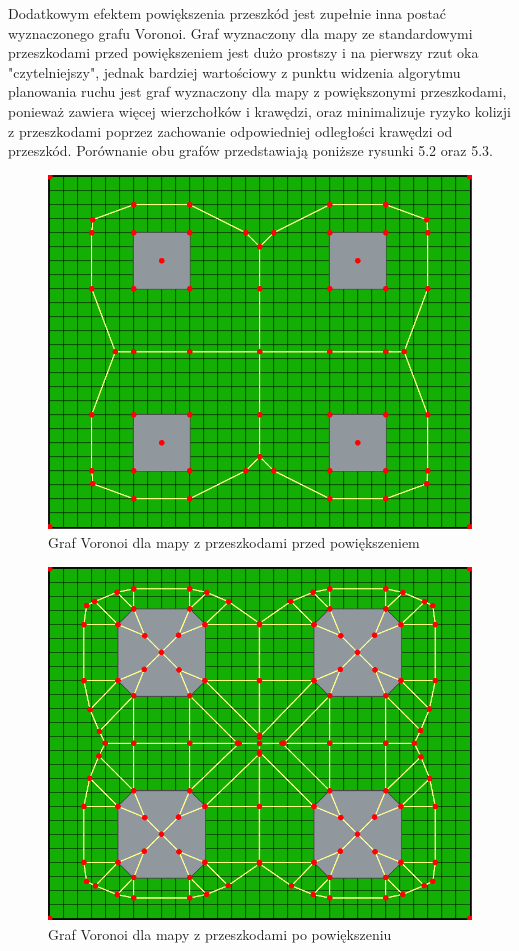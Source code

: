 \documentclass[a4paper,11pt,twoside]{report}
\theoremstyle{definition}
\begin{document}
Dodatkowym efektem powiększenia przeszkód jest zupełnie inna postać wyznaczonego grafu Voronoi. Graf wyznaczony dla mapy ze standardowymi przeszkodami przed powiększeniem jest dużo prostszy i na pierwszy rzut oka "czytelniejszy", jednak bardziej wartościowy z punktu widzenia algorytmu planowania ruchu jest graf wyznaczony dla mapy z powiększonymi przeszkodami, ponieważ zawiera więcej wierzchołków i krawędzi, oraz minimalizuje ryzyko kolizji z przeszkodami poprzez zachowanie odpowiedniej odległości krawędzi od przeszkód. Porównanie obu grafów przedstawiają poniższe rysunki 5.2 oraz 5.3.

\begin{figure}[h!]
\centering
\includegraphics[scale=0.4]{voronoiGraphForMap}
\caption[Graf Voronoi dla mapy z przeszkodami przed powiększeniem]{Graf Voronoi dla mapy z przeszkodami przed powiększeniem}
\end{figure}

\begin{figure}[h!]
\centering
\includegraphics[scale=0.4]{voronoiGraphForExpandedMap}
\caption[Graf Voronoi dla mapy z przeszkodami po powiększeniu]{Graf Voronoi dla mapy z przeszkodami po powiększeniu}
\end{figure}
\end{document}

